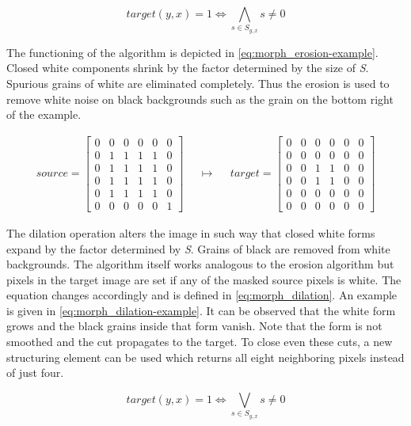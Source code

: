 \documentclass{report}
\begin{document}
\begin{equation}\label{eq:morph_erosion}
  target(y, x) = 1 \iff \bigwedge_{s \in S_{y, x}} s \neq 0
\end{equation}

The functioning of the algorithm is depicted in
\ref{eq:morph_erosion-example}. Closed white components shrink by the
factor determined by the size of \textit{S}. Spurious grains of white
are eliminated completely. Thus the erosion is used to remove white
noise on black backgrounds such as the grain on the bottom right of
the example.

\begin{align}\label{eq:morph_erosion-example}
  source = \begin{bmatrix}
    0 & 0 & 0 & 0 & 0 & 0 \\
    0 & 1 & 1 & 1 & 1 & 0 \\
    0 & 1 & 1 & 1 & 1 & 0 \\
    0 & 1 & 1 & 1 & 1 & 0 \\
    0 & 1 & 1 & 1 & 1 & 0 \\
    0 & 0 & 0 & 0 & 0 & 1
  \end{bmatrix}
  & &
  \mapsto
  & &
  target = \begin{bmatrix}
    0 & 0 & 0 & 0 & 0 & 0 \\
    0 & 0 & 0 & 0 & 0 & 0 \\
    0 & 0 & 1 & 1 & 0 & 0 \\
    0 & 0 & 1 & 1 & 0 & 0 \\
    0 & 0 & 0 & 0 & 0 & 0 \\
    0 & 0 & 0 & 0 & 0 & 0
  \end{bmatrix}
\end{align}

The dilation operation alters the image in such way that closed white
forms expand by the factor determined by \textit{S}. Grains of black
are removed from white backgrounds. The algorithm itself works
analogous to the erosion algorithm but pixels in the target image are
set if any of the masked source pixels is white. The equation changes
accordingly and is defined in \ref{eq:morph_dilation}. An example is
given in \ref{eq:morph_dilation-example}. It can be observed that the
white form grows and the black grains inside that form vanish. Note
that the form is not smoothed and the cut propagates to the target. To
close even these cuts, a new structuring element can be used which
returns all eight neighboring pixels instead of just four.

\begin{equation}\label{eq:morph_dilation}
  target(y, x) = 1 \iff \bigvee_{s \in S_{y, x}} s \neq 0
\end{equation}
\end{document}
